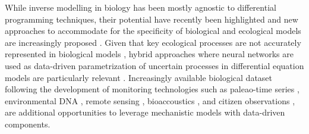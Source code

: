 While inverse modelling in biology has been mostly agnostic to differential programming techniques, their potential have recently been highlighted \cite{frank2022,alsos2023} and new approaches to accommodate for the specificity of biological and ecological models are increasingly proposed \cite{Yazdani2020,Boussange2024,paredes2023}. 
Given that key ecological processes are not accurately represented in biological models \cite{hartig2012,Schartau2017,chalmandrier2021}, hybrid approaches where neural networks are used as data-driven parametrization of uncertain processes in differential equation models are particularly relevant \cite{rasp2018,Boussange2024}.
Increasingly available biological dataset following the development of monitoring technologies such as paleao-time series \cite{alsos2023}, environmental DNA \cite{Ruppert2019}, remote sensing \cite{Jetz2019}, bioaccoustics \cite{Aide2013}, and citizen observations \cite{GBIF}, are additional opportunities to leverage mechanistic models with data-driven components.


